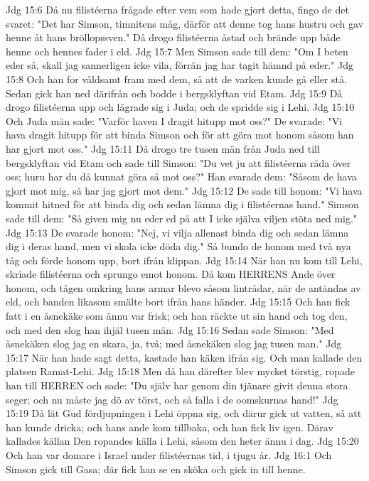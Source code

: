 Jdg 15:6  Då nu filistéerna frågade efter vem som hade gjort detta, fingo de det svaret: "Det har Simson, timnitens måg, därför att denne tog hans hustru och gav henne åt hans bröllopssven." Då drogo filistéerna åstad och brände upp både henne och hennes fader i eld.
Jdg 15:7  Men Simson sade till dem: "Om I beten eder så, skall jag sannerligen icke vila, förrän jag har tagit hämnd på eder."
Jdg 15:8  Och han for våldsamt fram med dem, så att de varken kunde gå eller stå. Sedan gick han ned därifrån och bodde i bergsklyftan vid Etam.
Jdg 15:9  Då drogo filistéerna upp och lägrade sig i Juda; och de spridde sig i Lehi.
Jdg 15:10  Och Juda män sade: "Varför haven I dragit hitupp mot oss?" De svarade: "Vi hava dragit hitupp för att binda Simson och för att göra mot honom såsom han har gjort mot oss."
Jdg 15:11  Då drogo tre tusen män från Juda ned till bergsklyftan vid Etam och sade till Simson: "Du vet ju att filistéerna råda över oss; huru har du då kunnat göra så mot oss?" Han svarade dem: "Såsom de hava gjort mot mig, så har jag gjort mot dem."
Jdg 15:12  De sade till honom: "Vi hava kommit hitned för att binda dig och sedan lämna dig i filistéernas hand." Simson sade till dem: "Så given mig nu eder ed på att I icke själva viljen stöta ned mig."
Jdg 15:13  De svarade honom: "Nej, vi vilja allenast binda dig och sedan lämna dig i deras hand, men vi skola icke döda dig." Så bundo de honom med två nya tåg och förde honom upp, bort ifrån klippan.
Jdg 15:14  När han nu kom till Lehi, skriade filistéerna och sprungo emot honom. Då kom HERRENS Ande över honom, och tågen omkring hans armar blevo såsom lintrådar, när de antändas av eld, och banden likasom smälte bort ifrån hans händer.
Jdg 15:15  Och han fick fatt i en åsnekäke som ännu var frisk; och han räckte ut sin hand och tog den, och med den slog han ihjäl tusen män.
Jdg 15:16  Sedan sade Simson: "Med åsnekäken slog jag en skara, ja, två; med åsnekäken slog jag tusen man."
Jdg 15:17  När han hade sagt detta, kastade han käken ifrån sig. Och man kallade den platsen Ramat-Lehi.
Jdg 15:18  Men då han därefter blev mycket törstig, ropade han till HERREN och sade: "Du själv har genom din tjänare givit denna stora seger; och nu måste jag dö av törst, och så falla i de oomskurnas hand!"
Jdg 15:19  Då lät Gud fördjupningen i Lehi öppna sig, och därur gick ut vatten, så att han kunde dricka; och hans ande kom tillbaka, och han fick liv igen. Därav kallades källan Den ropandes källa i Lehi, såsom den heter ännu i dag.
Jdg 15:20  Och han var domare i Israel under filistéernas tid, i tjugu år.
Jdg 16:1  Och Simson gick till Gasa; där fick han se en sköka och gick in till henne.
